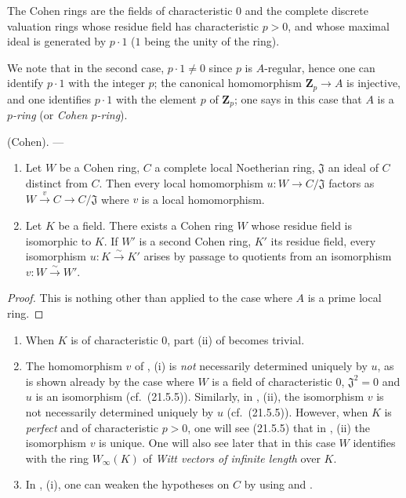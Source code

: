 \begin{proposition}[19.8.5]
\label{0.19.8.5}
The Cohen rings are the fields of characteristic $0$ and the complete discrete valuation rings whose residue field has characteristic $p>0$, and whose maximal ideal is generated by $p\cdot 1$ ($1$ being the unity of the ring).
\end{proposition}

We note that in the second case, $p\cdot 1\neq 0$ since $p$ is $A$-regular, hence one can identify $p\cdot 1$ with the integer $p$; the canonical homomorphism $\mathbf{Z}_p\to A$ is injective, and one identifies $p\cdot 1$ with the element $p$ of $\mathbf{Z}_p$; one says in this case that $A$ is a \emph{$p$-ring} (or \emph{Cohen $p$-ring}).

\begin{theorem}[19.8.6]
\label{0.19.8.6}
\textup{(Cohen).} ---
\begin{enumerate}
  \item[\rm(i)] Let $W$ be a Cohen ring, $C$ a complete local Noetherian ring, $\mathfrak{J}$ an ideal of $C$ distinct from $C$.
Then every local homomorphism $u:W\to C/\mathfrak{J}$ factors as $W\xrightarrow{v}C\to C/\mathfrak{J}$ where $v$ is a local homomorphism.
  \item[\rm(ii)] Let $K$ be a field.
There exists a Cohen ring $W$ whose residue field is isomorphic to $K$.
If $W'$ is a second Cohen ring, $K'$ its residue field, every isomorphism $u:K\xrightarrow{\sim}K'$ arises by passage to quotients from an isomorphism $v:W\xrightarrow{\sim}W'$.
\end{enumerate}
\end{theorem}

\begin{proof}
This is nothing other than  applied to the case where $A$ is a prime local ring.
\end{proof}

\begin{remarks}[19.8.7]
\label{0.19.8.7}
\begin{enumerate}
  \item[\rm(i)] When $K$ is of characteristic $0$, part (ii) of  becomes trivial.
  \item[\rm(ii)] The homomorphism $v$ of , (i) is \emph{not} necessarily determined uniquely by $u$, as is shown already by the case where $W$ is a field of characteristic $0$, $\mathfrak{J}^2=0$ and $u$ is an isomorphism (cf.\ (21.5.5)).
Similarly, in , (ii), the isomorphism $v$ is not necessarily determined uniquely by $u$ (cf.\ (21.5.5)).
However, when $K$ is \emph{perfect} and of characteristic $p>0$, one will see (21.5.5) that in , (ii) the isomorphism $v$ is unique.
One will also see later that in this case $W$ identifies with the ring $W_\infty(K)$ of \emph{Witt vectors of infinite length} over $K$.
  \item[\rm(iii)] In , (i), one can weaken the hypotheses on $C$ by using  and .
\end{enumerate}
\end{remarks}

